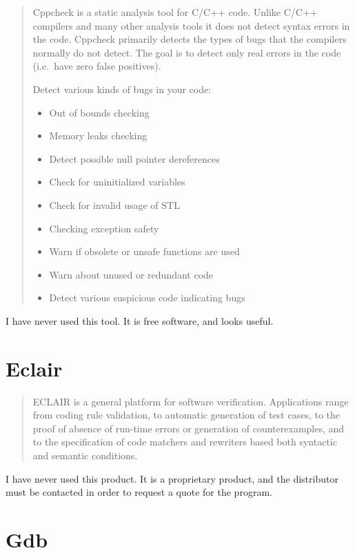 \documentclass[12pt]{article}
\begin{document}
\begin{quote}
Cppcheck is a static analysis tool for C/C++ code. Unlike C/C++ compilers
and many other analysis tools it does not detect syntax errors in the
code. Cppcheck primarily detects the types of bugs that the compilers
normally do not detect. The goal is to detect only real errors in the code
(i.e.\ have zero false positives).

Detect various kinds of bugs in your code:

\begin{itemize}
    \item Out of bounds checking
    \item Memory leaks checking
    \item Detect possible null pointer dereferences
    \item Check for uninitialized variables
    \item Check for invalid usage of STL
    \item Checking exception safety
    \item Warn if obsolete or unsafe functions are used
    \item Warn about unused or redundant code
    \item Detect various suspicious code indicating bugs
\end{itemize}
\end{quote}

I have never used this tool. It is free software, and looks useful.
\cite{cppcheck}
\section{Eclair}

\begin{quote}
ECLAIR is a general platform for software verification. Applications
range from coding rule validation, to automatic generation of
test cases, to the proof of absence of run-time errors or generation
of counterexamples, and to the specification of code matchers and
rewriters based both syntactic and semantic conditions.
\end{quote}

I have never used this product. It is a proprietary product, and the
distributor must be contacted in order to request a quote for the program.
\cite{eclair}
\section{Gdb}
\end{document}
